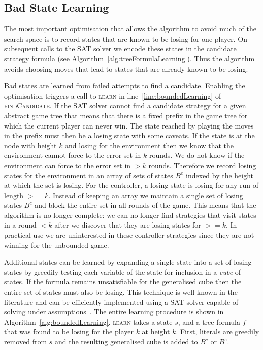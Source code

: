 \subsection{Bad State Learning}
\label{sec:boundedLearning}

The most important optimisation that allows the algorithm to avoid much of the search space is to record states that are known to be losing for one player. On subsequent calls to the SAT solver we encode these states in the candidate strategy formula (see Algorithm~\ref{alg:treeFormulaLearning}). Thus the algorithm avoids choosing moves that lead to states that are already known to be losing.

Bad states are learned from failed attempts to find a candidate. Enabling the optimisation triggers a call to \textsc{learn} in line~\ref{line:boundedLearning} of \textsc{findCandidate}.  If the SAT solver cannot find a candidate strategy for a given abstract game tree that means that there is a fixed prefix in the game tree for which the current player can never win. The state reached by playing the moves in the prefix must then be a losing state with some caveats. If the state is at the node with height $k$ and losing for the environment then we know that the environment cannot force to the error set in $k$ rounds. We do not know if the environment can force to the error set in $> k$ rounds. Therefore we record losing states for the environment in an array of sets of states $B^e$ indexed by the height at which the set is losing. For the controller, a losing state is losing for any run of length $>= k$. Instead of keeping an array we maintain a single set of losing states $B^c$ and block the entire set in all rounds of the game. This means that the algorithm is no longer complete: we can no longer find strategies that visit states in a round $<k$ after we discover that they are losing states for $>=k$. In practical use we are uninterested in these controller strategies since they are not winning for the unbounded game.

Additional states can be learned by expanding a single state into a set of losing states by greedily testing each variable of the state for inclusion in a \emph{cube} of states. If the formula remains unsatisfiable for the generalised cube then the entire set of states must also be losing. This technique is well known in the literature and can be efficiently implemented using a SAT solver capable of solving under assumptions~\cite{Een03}. The entire learning procedure is shown in Algorithm~\ref{alg:boundedLearning}. \textsc{learn} takes a state $s$, and a tree formula $f$ that was found to be losing for the player $k$ at height $k$. First, literals are greedily removed from $s$ and the resulting generalised cube is added to $B^c$ or $B^e$.

